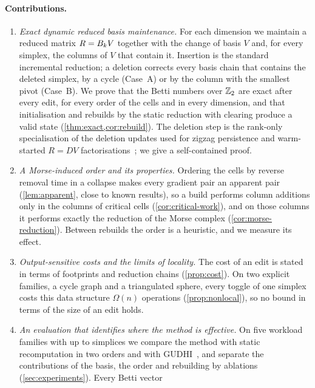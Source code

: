 \paragraph{Contributions.}
\begin{enumerate}[label=(\roman*),leftmargin=2.2em]
\item \emph{Exact dynamic reduced basis maintenance.} For each dimension we
  maintain a reduced matrix $R=B_{k}V$ together with the change of basis $V$
  and, for every simplex, the columns of $V$ that contain it. Insertion is the
  standard incremental reduction; a deletion corrects every basis chain that
  contains the deleted simplex, by a cycle (Case~A) or by the column with the
  smallest pivot (Case~B). We prove that the Betti numbers over $\mathbb{Z}_2$ are exact
  after every edit, for every order of the cells and in every dimension, and
  that initialisation and rebuilds by the static reduction with clearing produce
  a valid state (\cref{thm:exact,cor:rebuild}). The deletion step is the
  rank-only specialisation of the deletion updates used for zigzag persistence
  and warm-started $R=DV$
  factorisations~\cite{carlsson2009zigzag,luo2023warmstart,giunti2026pruning};
  we give a self-contained proof.
\item \emph{A Morse-induced order and its properties.} Ordering the cells by
  reverse removal time in a collapse makes every gradient pair an apparent pair
  (\cref{lem:apparent}, close to known results), so a build performs column
  additions only in the columns of critical cells (\cref{cor:critical-work}), and
  on those columns it performs exactly the reduction of the Morse complex
  (\cref{cor:morse-reduction}). Between rebuilds the order is a heuristic, and
  we measure its effect.
\item \emph{Output-sensitive costs and the limits of locality.} The cost of an
  edit is stated in terms of footprints and reduction chains
  (\cref{prop:cost}). On two explicit families, a cycle graph and a
  triangulated sphere, every toggle of one simplex costs this data structure
  $\Omega(n)$ operations (\cref{prop:nonlocal}), so no bound in terms of the size
  of an edit holds.
\item \emph{An evaluation that identifies where the method is effective.} On
  five workload families with up to \NumSizeMax{} simplices we compare the
  method with static recomputation in two orders and with
  GUDHI~\cite{maria2014gudhi}, and separate the contributions of the basis, the
  order and rebuilding by ablations (\cref{sec:experiments}). Every Betti vector

\end{enumerate}
